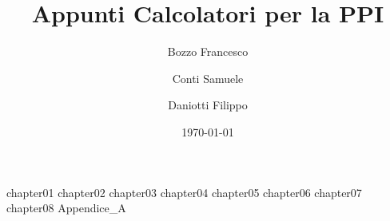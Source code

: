 \documentclass[a4paper,12pt, oneside]{book}
\author{Bozzo Francesco \and Conti Samuele \and Daniotti Filippo}
\title{Appunti Calcolatori per la PPI}
\date{\today}
\begin{document}
	\frontmatter
	\maketitle
	\tableofcontents

	\mainmatter

	{chapter01}
	{chapter02}
	{chapter03}
	{chapter04}
	{chapter05}
	{chapter06}
	{chapter07}
	{chapter08}
	{Appendice_A}

	\backmatter
\end{document}
